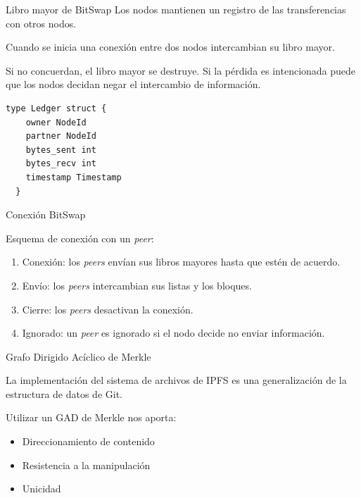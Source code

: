 \documentclass[spanish]{beamer}
\begin{document}
\begin{frame}[fragile]{Libro mayor de BitSwap}
  Los nodos mantienen un registro de las transferencias con otros nodos.

  Cuando se inicia una conexión entre dos nodos intercambian su libro mayor.

  Si no concuerdan, el libro mayor se destruye. Si la pérdida es intencionada puede que los nodos decidan negar el intercambio de información.

  \begin{lstlisting}[caption={Implementación del libro mayor.}, language=Golang]
  type Ledger struct {
    owner NodeId
    partner NodeId
    bytes_sent int
    bytes_recv int
    timestamp Timestamp
  }
\end{lstlisting}
\end{frame}

\begin{frame}{Conexión BitSwap}

  Esquema de conexión con un \textit{peer}:

  \begin{enumerate}
    \item Conexión: los \textit{peers} envían sus libros mayores hasta que estén de acuerdo.
    \item Envío: los \textit{peers} intercambian sus listas y los bloques.
    \item Cierre: los \textit{peers} desactivan la conexión.
    \item Ignorado: un \textit{peer} es ignorado si el nodo decide no enviar información.
  \end{enumerate}

\end{frame}

\begin{frame}{Grafo Dirigido Acíclico de Merkle}

La implementación del sistema de archivos de IPFS es una generalización de la estructura de datos de Git.

Utilizar un GAD de Merkle nos aporta:

\begin{itemize}
  \item Direccionamiento de contenido
  \item Resistencia a la manipulación
  \item Unicidad
\end{itemize}

\end{frame}
\end{document}
